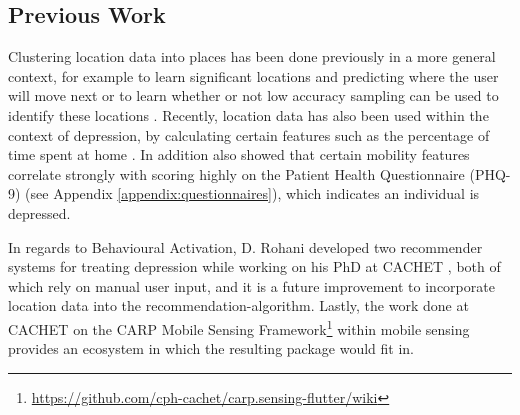 \subsection{Previous Work}
Clustering location data into places has been done previously in a more general context, for example to learn significant locations and predicting where the user will move next \cite{learning_significant_locations} or to learn whether or not low accuracy sampling can be used to identify these locations \cite{sparse-location-2014}. Recently, location data has also been used within the context of depression, by calculating certain features such as the percentage of time spent at home \cite{Saeb2015, Canzian2015}. In addition \cite{Saeb2015} also showed that certain mobility features correlate strongly with scoring highly on the Patient Health Questionnaire (PHQ-9) (see Appendix \ref{appendix:questionnaires}), which indicates an individual is depressed.  

In regards to Behavioural Activation, D. Rohani developed two recommender systems for treating depression while working on his PhD at CACHET \cite{mubs-rohani, moribus}, both of which rely on manual user input, and it is a future improvement to incorporate location data into the recommendation-algorithm. Lastly, the work done at CACHET on the CARP Mobile Sensing Framework\footnote{\url{https://github.com/cph-cachet/carp.sensing-flutter/wiki}} within mobile sensing provides an ecosystem in which the resulting package would fit in.